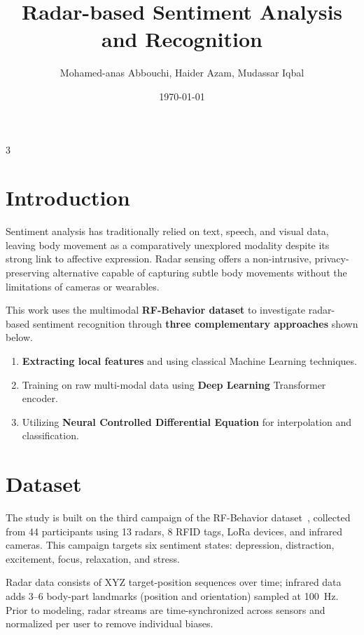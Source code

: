 \documentclass[final]{beamer}
\title
[Radar-based Sentiment Analysis and Recognition] %
{ %
Radar-based Sentiment Analysis and Recognition
}
\author{ %
Mohamed-anas Abbouchi\inst{1}, Haider Azam\inst{2}, Mudassar Iqbal\inst{3}
}
\institute
[RF-Behavior Sentiment Recognition] %
{
\inst{1} Aalto University
\inst{2} Universitat Politecnica de Catalunya
\inst{3} Technische Universitat Braunschweig
}
\date{\today}
\begin{document}
\begin{frame}[t]
\hspace{1cm}
\begin{multicols}{3}

\section{Introduction}

Sentiment analysis has traditionally relied on text, speech, and visual data, leaving body movement as a comparatively unexplored modality despite its strong link to affective expression. Radar sensing offers a non-intrusive, privacy-preserving alternative capable of capturing subtle body movements without the limitations of cameras or wearables.

This work uses the multimodal \textbf{RF-Behavior dataset} to investigate radar-based sentiment recognition through \textbf{three complementary approaches} shown below.
\begin{enumerate}
\item \textbf{Extracting local features} and using classical Machine Learning techniques.
\item Training on raw multi-modal data using \textbf{Deep Learning} Transformer encoder.
\item Utilizing \textbf{Neural Controlled Differential Equation} for interpolation and classification.
\end{enumerate}

\hspace{1cm}

\section{Dataset}

The study is built on the third campaign of the RF-Behavior dataset~\cite{zuo2025}, collected from 44 participants using 13 radars, 8 RFID tags, LoRa devices, and infrared cameras. This campaign targets six sentiment states: depression, distraction, excitement, focus, relaxation, and stress.

Radar data consists of XYZ target-position sequences over time; infrared data adds 3--6 body-part landmarks (position and orientation) sampled at 100~Hz. Prior to modeling, radar streams are time-synchronized across sensors and normalized per user to remove individual biases.

\hspace{1cm}


\end{multicols}
\end{frame}
\end{document}
